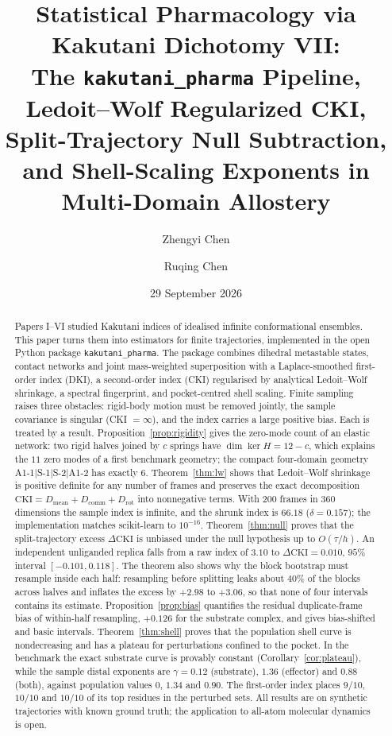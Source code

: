 \documentclass[11pt,reqno]{amsart}
\title[Statistical pharmacology via Kakutani dichotomy VII]{Statistical Pharmacology via Kakutani Dichotomy VII:\\ The \texttt{kakutani\_pharma} Pipeline, Ledoit--Wolf Regularized CKI, Split-Trajectory Null Subtraction, and Shell-Scaling Exponents in Multi-Domain Allostery}
\author[Z. Chen]{Zhengyi Chen}
\author[R. Chen]{Ruqing Chen}
\date{29 September 2026}
\theoremstyle{plain}
\theoremstyle{definition}
\theoremstyle{remark}
\numberwithin{equation}{section}
\newcommand{\DCKI}{\Delta\mathrm{CKI}}
\newcommand{\pkg}{\texttt{kakutani\_pharma}}
\begin{document}
\begin{abstract}
Papers I--VI studied Kakutani indices of idealised infinite conformational ensembles. This paper turns them into estimators for finite trajectories, implemented in the open Python package \pkg{}. The package combines dihedral metastable states, contact networks and joint mass-weighted superposition with a Laplace-smoothed first-order index (DKI), a second-order index (CKI) regularised by analytical Ledoit--Wolf shrinkage, a spectral fingerprint, and pocket-centred shell scaling. Finite sampling raises three obstacles: rigid-body motion must be removed jointly, the sample covariance is singular (CKI $=\infty$), and the index carries a large positive bias. Each is treated by a result. Proposition~\ref{prop:rigidity} gives the zero-mode count of an elastic network: two rigid halves joined by $c$ springs have $\dim\ker H=12-c$, which explains the $11$ zero modes of a first benchmark geometry; the compact four-domain geometry A1-1$|$S-1$|$S-2$|$A1-2 has exactly $6$. Theorem~\ref{thm:lw} shows that Ledoit--Wolf shrinkage is positive definite for any number of frames and preserves the exact decomposition $\mathrm{CKI}=D_{\mathrm{mean}}+D_{\mathrm{comm}}+D_{\mathrm{rot}}$ into nonnegative terms. With $200$ frames in $360$ dimensions the sample index is infinite, and the shrunk index is $66.18$ ($\delta=0.157$); the implementation matches scikit-learn to $10^{-16}$. Theorem~\ref{thm:null} proves that the split-trajectory excess $\DCKI$ is unbiased under the null hypothesis up to $O(\tau/h)$. An independent unliganded replica falls from a raw index of $3.10$ to $\DCKI=0.010$, $95\%$ interval $[-0.101,0.118]$. The theorem also shows why the block bootstrap must resample inside each half: resampling before splitting leaks about $40\%$ of the blocks across halves and inflates the excess by $+2.98$ to $+3.06$, so that none of four intervals contains its estimate. Proposition~\ref{prop:bias} quantifies the residual duplicate-frame bias of within-half resampling, $+0.126$ for the substrate complex, and gives bias-shifted and basic intervals. Theorem~\ref{thm:shell} proves that the population shell curve is nondecreasing and has a plateau for perturbations confined to the pocket. In the benchmark the exact substrate curve is provably constant (Corollary~\ref{cor:plateau}), while the sample distal exponents are $\gamma=0.12$ (substrate), $1.36$ (effector) and $0.88$ (both), against population values $0$, $1.34$ and $0.90$. The first-order index places $9/10$, $10/10$ and $10/10$ of its top residues in the perturbed sets. All results are on synthetic trajectories with known ground truth; the application to all-atom molecular dynamics is open.
\end{abstract}
\end{document}
